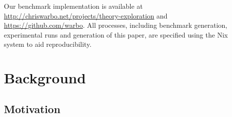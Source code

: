 \begin{sloppypar}
  Our benchmark implementation is available at
  \url{http://chriswarbo.net/projects/theory-exploration} and
  \url{https://github.com/warbo}. All processes, including benchmark generation,
  experimental runs and generation of this paper, are specified using the
  Nix~\cite{dolstra2004nix} system to aid reproducibility.
\end{sloppypar}

\section{Background}
\label{sec:background}

\subsection{Motivation}
\label{sec:motivation}

